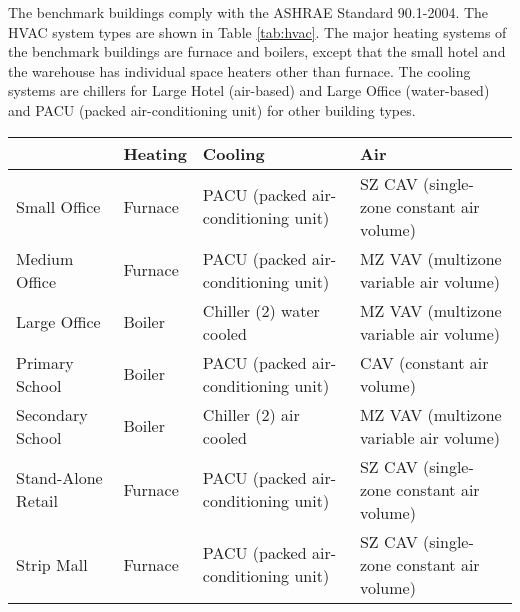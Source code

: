 \documentclass[hidelinks,12pt]{article}
\newcommand{\tref}[1]{Table \ref{#1}}
\begin{document}
The benchmark buildings comply with the ASHRAE Standard 90.1-2004. The
HVAC system types are shown in \tref{tab:hvac}. The major heating
systems of the benchmark buildings are furnace and boilers, except
that the small hotel and the warehouse has individual space heaters
other than furnace. The cooling systems are chillers for Large Hotel
(air-based) and Large Office (water-based) and PACU (packed
air-conditioning unit) for other building types.~

\begin{table}[h!]
\centering
\scriptsize
\caption{Benchmark Building HVAC System}
\label{tab:hvac}
\begin{longtable}{l|p{3cm}|p{4cm}|p{4cm}}
  \hline
  & Heating                                & Cooling                                                                     & Air                                                     \\
  \hline
  \hline
  Small Office             & Furnace                                & PACU (packed air-conditioning unit)                                         & SZ CAV (single-zone constant air volume)                \\
  \hline
  Medium Office            & Furnace                                & PACU (packed air-conditioning unit)                                         & MZ VAV (multizone variable air volume)                  \\
  \hline
  Large Office             & Boiler                                 & Chiller (2) water cooled                                                    & MZ VAV (multizone variable air volume)                  \\
  \hline
  Primary School           & Boiler                                 & PACU (packed air-conditioning unit)                                         & CAV (constant air volume)                               \\
  \hline
  Secondary School         & Boiler                                 & Chiller (2) air cooled                                                      & MZ VAV (multizone variable air volume)                  \\
  \hline
  Stand-Alone Retail       & Furnace                                & PACU (packed air-conditioning unit)                                         & SZ CAV (single-zone constant air volume)                \\
  \hline
  Strip Mall               & Furnace                                & PACU (packed air-conditioning unit)                                         & SZ CAV (single-zone constant air volume)                \\

\end{longtable}
\end{table}
\end{document}
